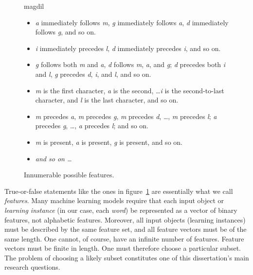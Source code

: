 \begin{figure}[ht]
\caption{Innumerable possible features.}
\label{fig:many-feats}
\begin{center}
\Large{magdil}
\end{center}
\begin{itemize}
  \item \textit{a} immediately follows \textit{m}, \textit{g} immediately follows \textit{a}, \textit{d} immediately follows \textit{g}, and so on. 
  \item \textit{i} immediately precedes \textit{l}, \textit{d} immediately precedes \textit{i}, and so on. %
   \item \textit{g} follows both \textit{m} and \textit{a}, \textit{d} follows \textit{m}, \textit{a}, and \textit{g}; \textit{d} precedes both \textit{i} and \textit{l}, \textit{g} precedes \textit{d}, \textit{i}, and \textit{l}, and so on.
   \item \textit{m} is the first character, \textit{a} is the second, \dots \textit{i} is the second-to-last character, and \textit{l} is the last character, and so on.
   \item \textit{m} precedes \textit{a}, \textit{m} precedes \textit{g}, \textit{m} precedes \textit{d}, \dots, \textit{m} precedes \textit{l}; \textit{a} precedes \textit{g}, \dots , \textit{a} precedes \textit{l}; and so on.
   \item \textit{m} is present, \textit{a} is present, \textit{g} is present, and so on.
   \item \emph{and so on \dots}
\end{itemize}
\end{figure}

True-or-false statements like the ones in figure~\ref{fig:many-feats} are essentially what we call \emph{features}.
Many machine learning models require that each input object or \emph{learning instance} 
(in our case, each \emph{word}) be represented as a vector of binary features, not alphabetic 
features. Moreover, all input objects (learning instances) must be described by the same feature 
set, and all feature vectors must be of the same length.
One cannot, of course, have an infinite number of features. Feature vectors must be finite in length.
One must therefore choose a particular subset. The problem of choosing a likely subset constitutes one of
this dissertation's main research questions. 

